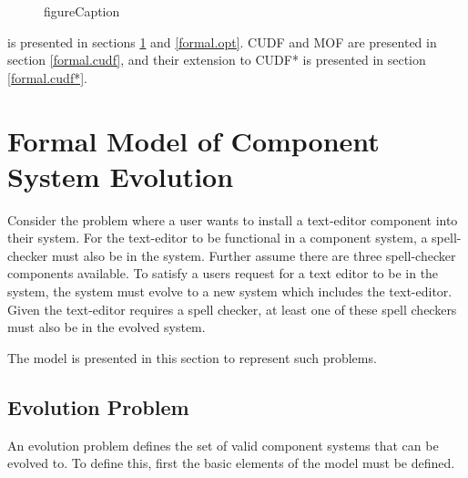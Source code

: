 \begin{figure}[htp]
\begin{center}

  \caption[labelInTOC]{figureCaption}
  \label{formal.modeldiagram}
\end{center}
\end{figure}

\modelname is presented in sections \ref{formal.step} and \ref{formal.opt}.
CUDF and MOF are presented in section \ref{formal.cudf}, and their extension to CUDF* is presented in section \ref{formal.cudf*}.
 
\section{Formal Model of Component System Evolution}
\label{formal.step}
Consider the problem where a user wants to install a text-editor component into their system.
For the text-editor to be functional in a component system, a spell-checker must also be in the system. 
Further assume there are three spell-checker components available.
To satisfy a users request for a text editor to be in the system, the system must evolve to a new system which includes the text-editor.
Given the text-editor requires a spell checker, at least one of these spell checkers must also be in the evolved system.

The \modelname model is presented in this section to represent such problems. 

\subsection{Evolution Problem}
An evolution problem defines the set of valid component systems that can be evolved to.
To define this, first the basic elements of the model must be defined.


